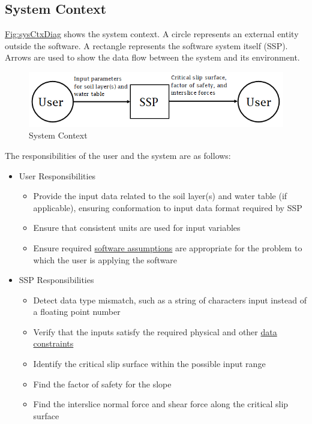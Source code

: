 \documentclass[12pt]{article}
\begin{document}
\subsection{System Context}
\label{Sec:SysContext}
\hyperref[Figure:sysCtxDiag]{Fig:sysCtxDiag} shows the system context. A circle represents an external entity outside the software. A rectangle represents the software system itself (SSP). Arrows are used to show the data flow between the system and its environment.

\begin{figure}
\begin{center}
\includegraphics[width=\textwidth]{../../../../datafiles/ssp/SystemContextFigure.png}
\caption{System Context}
\label{Figure:sysCtxDiag}
\end{center}
\end{figure}
The responsibilities of the user and the system are as follows:

\begin{itemize}
\item{User Responsibilities}
\begin{itemize}
\item{Provide the input data related to the soil layer(s) and water table (if applicable), ensuring conformation to input data format required by SSP}
\item{Ensure that consistent units are used for input variables}
\item{Ensure required \hyperref[Sec:Assumps]{software assumptions} are appropriate for the problem to which the user is applying the software}
\end{itemize}
\item{SSP Responsibilities}
\begin{itemize}
\item{Detect data type mismatch, such as a string of characters input instead of a floating point number}
\item{Verify that the inputs satisfy the required physical and other \hyperref[Sec:DataConstraints]{data constraints}}
\item{Identify the critical slip surface within the possible input range}
\item{Find the factor of safety for the slope}
\item{Find the interslice normal force and shear force along the critical slip surface}
\end{itemize}
\end{itemize}
\end{document}
